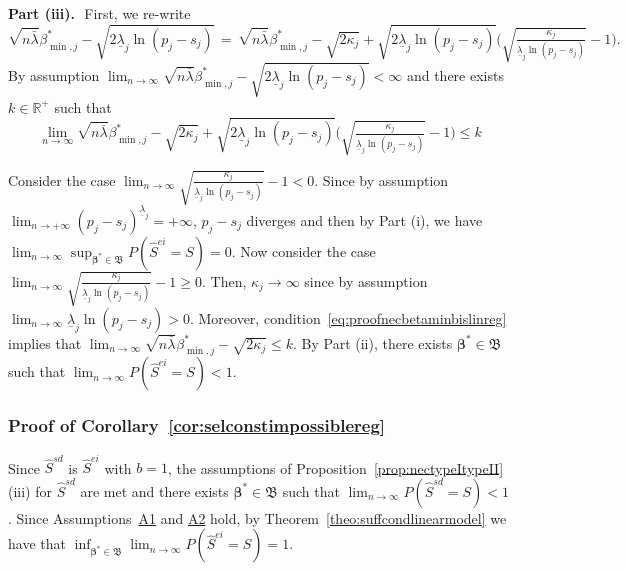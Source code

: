 \documentclass[
  12pt]{article}
\newcommand{\R}{\mathbb{R}}
\newcommand{\bbeta}{\boldsymbol{\beta}}
\newcommand{\bB}{\mathfrak{B}}
\begin{document}
\textbf{Part (iii).}\,\,
 First, we re-write 
 $$\sqrt{n\bar{\lambda}}\beta_{\min,j}^*-\sqrt{2\underline{\lambda}_j\ln(p_j-s_j)} \,=\, \sqrt{n\bar{\lambda}}\beta_{\min,j}^*-\sqrt{2\kappa_j}+\sqrt{2\underline{\lambda}_j\ln(p_j-s_j)}\Big(\sqrt{\tfrac{\kappa_j}{\underline{\lambda}_j\ln(p_j-s_j)}}-1\Big).$$ 
 By assumption $\lim_{n\to\infty}\sqrt{n\bar{\lambda}}\beta_{\min,j}^*-\sqrt{2\underline{\lambda}_j\ln(p_j-s_j)} < \infty$ and there exists $k\in\R^+$ such that
  \begin{equation}\label{eq:proofnecbetaminbislinreg}
      \lim_{n\to \infty}\sqrt{n\bar{\lambda}}\beta_{\min,j}^*-\sqrt{2\kappa_j}+\sqrt{2\underline{\lambda}_j\ln(p_j-s_j)}\Big(\sqrt{\tfrac{\kappa_j}{\underline{\lambda}_j\ln(p_j-s_j)}}-1\Big)\leq k
  \end{equation}

Consider the case $\lim_{n\to \infty}\sqrt{\tfrac{\kappa_j}{\underline{\lambda}_j\ln(p_j-s_j)}}-1<0$. Since by assumption $\lim_{n\to+\infty}(p_j-s_j)^{\underline{\lambda}_j}=+\infty$, $p_j-s_j$ diverges and then by Part (i), we have $\lim_{n\to \infty}\sup_{\bbeta^*\in\bB}P(\hat{S}^{ei} = S)=0$. Now consider the case $\lim_{n\to \infty}\sqrt{\tfrac{\kappa_j}{\underline{\lambda}_j\ln(p_j-s_j)}}-1 \geq0$. Then, $\kappa_j\to\infty$ since by assumption $\lim_{n\to \infty}\underline{\lambda}_j\ln(p_j-s_j) >0$. Moreover, condition~\eqref{eq:proofnecbetaminbislinreg} implies that $\lim_{n\to \infty}\sqrt{n\bar{\lambda}}\beta_{\min,j}^*-\sqrt{2\kappa_j} \leq k$. By Part (ii), there exists $\bbeta^*\in\bB$ such that $\lim_{n\to \infty}P(\hat{S}^{ei} = S)< 1$.

\subsubsection{Proof of Corollary~\ref{cor:selconstimpossiblereg}}
Since $\hat{S}^{sd}$ is $\hat{S}^{ei}$ with $b=1$, the assumptions of Proposition~\ref{prop:nectypeItypeII} (iii) for $\hat{S}^{sd}$ are met and there exists $\bbeta^*\in\mathfrak{B}$ such that $\lim_{n \to \infty} P(\hat{S}^{sd} = S) < 1$. Since Assumptions~\hyperlink{lab:A1}{A1} and \hyperlink{lab:A2}{A2} hold, by Theorem~\ref{theo:suffcondlinearmodel} we have that $\inf_{\bbeta^*\in\mathfrak{B}}\lim_{n \to \infty} P(\hat{S}^{ei} = S)= 1$.
\end{document}
